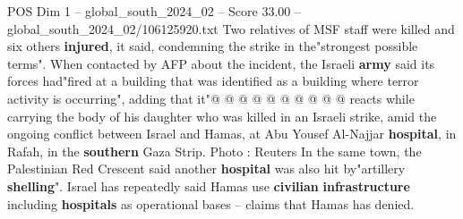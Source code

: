 \begin{textsample}{POS Dim 1 – global\_south\_2024\_02 – Score 33.00 – global\_south\_2024\_02/106125920.txt}
Two relatives of MSF staff were killed and six others \textbf{injured}, it said, condemning the strike in the"strongest possible terms".
When contacted by AFP about the incident, the Israeli \textbf{army} said its forces had"fired at a building that was identified as a building where terror activity is occurring", adding that it"@ @ @ @ @ @ @ @ @ @ reacts while carrying the body of his daughter who was killed in an Israeli strike, amid the ongoing conflict between Israel and Hamas, at Abu Yousef Al-Najjar \textbf{hospital}, in Rafah, in the \textbf{southern} Gaza Strip.
Photo : Reuters In the same town, the Palestinian Red Crescent said another \textbf{hospital} was also hit by"artillery \textbf{shelling}".
Israel has repeatedly said Hamas use \textbf{civilian} \textbf{infrastructure} including \textbf{hospitals} as operational bases -- claims that Hamas has denied.

\end{textsample}
